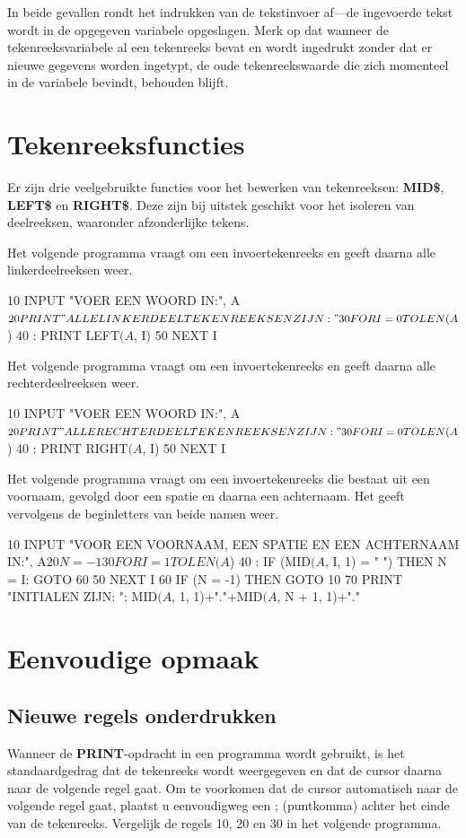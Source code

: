 In beide gevallen rondt het indrukken van  de tekstinvoer af---de ingevoerde tekst wordt in de opgegeven variabele opgeslagen. Merk op dat wanneer de tekenreeksvariabele al een tekenreeks bevat en  wordt ingedrukt zonder dat er nieuwe gegevens worden ingetypt, de oude tekenreekswaarde die zich momenteel in de variabele bevindt, behouden blijft.

\section{Tekenreeksfuncties}Er zijn drie veelgebruikte functies voor het bewerken van tekenreeksen: {\bf MID\$}, {\bf LEFT\$} en {\bf RIGHT\$}. Deze zijn bij uitstek geschikt voor het isoleren van deelreeksen, waaronder afzonderlijke tekens.

Het volgende programma vraagt om een invoertekenreeks en geeft daarna alle linkerdeelreeksen weer.
\begin{screencode}
10 INPUT "VOER EEN WOORD IN:", A$
20 PRINT "ALLE LINKER DEELTEKENREEKSEN ZIJN:"
30 FOR I = 0 TO LEN(A$)
40 :  PRINT LEFT$(A$, I)
50 NEXT I
\end{screencode}

Het volgende programma vraagt om een invoertekenreeks en geeft daarna alle rechterdeelreeksen weer.
\begin{screencode}
10 INPUT "VOER EEN WOORD IN:", A$
20 PRINT "ALLE RECHTER DEELTEKENREEKSEN ZIJN:"
30 FOR I = 0 TO LEN(A$)
40 :  PRINT RIGHT$(A$, I)
50 NEXT I
\end{screencode}

Het volgende programma vraagt om een invoertekenreeks die bestaat uit een voornaam, gevolgd door een spatie en daarna een achternaam. Het geeft vervolgens de beginletters van beide namen weer.
\begin{screencode}
10 INPUT "VOOR EEN VOORNAAM, EEN SPATIE EN EEN ACHTERNAAM IN:", A$
20 N = -1
30 FOR I = 1 TO LEN(A$)
40 :  IF (MID$(A$, I, 1) = " ") THEN N = I: GOTO 60
50 NEXT I
60 IF (N = -1) THEN GOTO 10
70 PRINT "INITIALEN ZIJN: "; MID$(A$, 1, 1)+"."+MID$(A$, N + 1, 1)+"."
\end{screencode}

\section{Eenvoudige opmaak}

\subsection{Nieuwe regels onderdrukken}Wanneer de {\bf PRINT}-opdracht in een programma wordt gebruikt, is het standaardgedrag dat de tekenreeks wordt weergegeven en dat de cursor daarna naar de volgende regel gaat. Om te voorkomen dat de cursor automatisch naar de volgende regel gaat, plaatst u eenvoudigweg een ; (puntkomma) achter het einde van de tekenreeks. Vergelijk de regels 10, 20 en 30 in het volgende programma.

